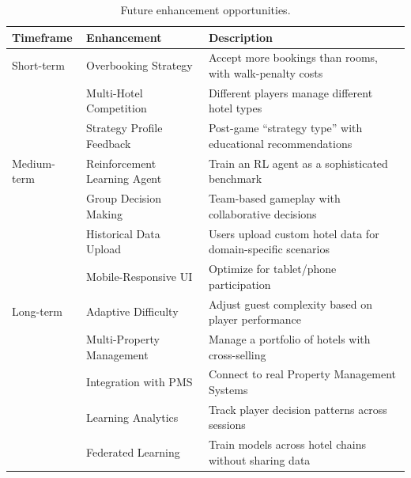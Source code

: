 \documentclass[12pt,a4paper,openany]{report}
\begin{document}
\begin{table}[htbp]
\centering
\caption{Future enhancement opportunities.}
\label{tab:future}
\small

\begin{tabularx}{\textwidth}{@{}l l X@{}}
\toprule
\textbf{Timeframe} & \textbf{Enhancement} & \textbf{Description} \\
\midrule
Short-term & Overbooking Strategy       & Accept more bookings than rooms, with walk-penalty costs \\
           & Multi-Hotel Competition    & Different players manage different hotel types \\
           & Strategy Profile Feedback  & Post-game ``strategy type'' with educational recommendations \\
\midrule
Medium-term & Reinforcement Learning Agent & Train an RL agent as a sophisticated benchmark \\
            & Group Decision Making        & Team-based gameplay with collaborative decisions \\
            & Historical Data Upload       & Users upload custom hotel data for domain-specific scenarios \\
            & Mobile-Responsive UI         & Optimize for tablet/phone participation \\
\midrule
Long-term & Adaptive Difficulty         & Adjust guest complexity based on player performance \\
          & Multi-Property Management   & Manage a portfolio of hotels with cross-selling \\
          & Integration with PMS        & Connect to real Property Management Systems \\
          & Learning Analytics          & Track player decision patterns across sessions \\
          & Federated Learning          & Train models across hotel chains without sharing data \\
\bottomrule
\end{tabularx}

\end{table}
\end{document}
